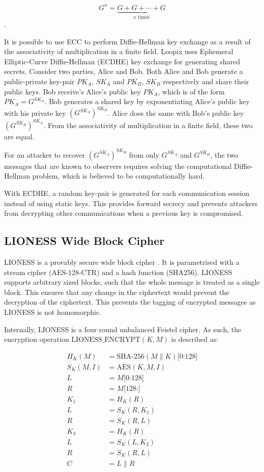 \documentclass[final,dissertation.tex]{subfiles}
\begin{document}
$$G^x = \underbrace{G + G + \cdots + G}_{x \text{ times}}$$.

It is possible to use ECC to perform Diffie-Hellman key exchange as a result of the associativity of multiplication in a finite field. Loopix uses Ephemeral Elliptic-Curve Diffie-Hellman (ECDHE) key exchange for generating shared secrets. Consider two parties, Alice and Bob. Both Alice and Bob generate a public-private key-pair $PK_A$, $SK_A$ and $PK_B$, $SK_B$ respectively and share their public keys. Bob receive's Alice's public key $PK_A$, which is of the form $PK_A = G^{SK_A}$. Bob generates a shared key by exponentiating Alice's public key with his private key $(G^{SK_A})^{SK_B}$. Alice does the same  with Bob's public key $(G^{SK_B})^{SK_A}$. From the associativity of multiplication in a finite field, these two are equal.

For an attacker to recover $(G^{SK_A})^{SK_B}$ from only $G^{SK_A}$ and $G^{SK_B}$, the two messages that are known to observers requires solving the computational Diffie-Hellman problem, which is believed to be computationally hard.

With ECDHE, a random key-pair is generated for each communication session instead of using static keys. This provides forward secrecy and prevents attackers from decrypting other communications when a previous key is compromised.

\subsection{LIONESS Wide Block Cipher}

LIONESS is a provably secure wide block cipher \cite{anderson1996two}. It is parametrised with a stream cipher (AES-128-CTR) and a hash function (SHA256). LIONESS supports arbitrary sized blocks, such that the whole message is treated as a single block. This ensures that any change in the ciphertext would prevent the decryption of the ciphertext. This prevents the tagging of encrypted messages as LIONESS is not homomorphic.

Internally, LIONESS is a four round unbalanced Feistel cipher. As such, the encryption operation $\text{LIONESS\_ENCRYPT}(K, M)$ is described as:

\begin{align*}
H_K(M) &= \text{SHA-256}(M\|K)\text{[0:128]} \\
S_K(M, I) &= \text{AES}(K, M, I) \\
L &= M\text{[0:128]} \\
R &= M\text{[128:]}  \\
K_1 &= H_K(R) \\
L &= S_K(R, K_1) \\
R &= S_K(R, L) \\
K_3 &= H_K(R) \\
L &= S_K(L, K_3) \\
R &= S_K(R, L) \\
C &= L\|R
\end{align*}
\end{document}
